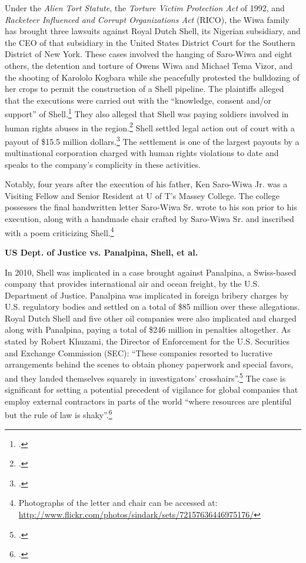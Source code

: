 \documentclass[10pt]{article}
\begin{document}
Under the \emph{Alien Tort Statute}, the \emph{Torture Victim Protection Act} of 1992, and \emph{Racketeer Influenced and Corrupt Organizations Act} (RICO), the Wiwa family has brought three lawsuits against Royal Dutch Shell, its Nigerian subsidiary, and the CEO of that subsidiary in the United States District Court for the Southern District of New York.
These cases involved the hanging of Saro-Wiwa and eight others, the detention and torture of Owens Wiwa and Michael Tema Vizor, and the shooting of Karololo Kogbara while she peacefully protested the bulldozing of her crops to permit the construction of a Shell pipeline.
The plaintiffs alleged that the executions were carried out with the ``knowledge, consent and/or support'' of Shell.\footcite{ShellTrialDelayed}
They also alleged that Shell was paying soldiers involved in human rights abuses in the region.\footcite{Shell15Million}
Shell settled legal action out of court with a payout of \$15.5 million dollars.\footcite{Shell15Million}
The settlement is one of the largest payouts by a multinational corporation charged with human rights violations to date and speaks to the company's complicity in these activities.



Notably, four years after the execution of his father, Ken Saro-Wiwa Jr. was a Visiting Fellow and Senior Resident at U of T's Massey College.
The college possesses the final handwritten letter Saro-Wiwa Sr. wrote to his son prior to his execution, along with a handmade chair crafted by Saro-Wiwa Sr. and inscribed with a poem criticizing Shell.\footnote{Photographs of the letter and chair can be accessed at: \url{http://www.flickr.com/photos/sindark/sets/72157636446975176/}}



\textbf{US Dept. of Justice vs. Panalpina, Shell, et al.}



In 2010, Shell was implicated in a case brought against Panalpina, a Swiss-based company that provides international air and ocean freight, by the U.S. Department of Justice. 
Panalpina was implicated in foreign bribery charges by U.S. regulatory bodies and settled on a total of \$85 million over these allegations. 
Royal Dutch Shell and five other oil companies were also implicated and charged along with Panalpina, paying a total of \$246 million in penalties altogether. 
As stated by Robert Khuzami, the Director of Enforcement for the U.S. Securities and Exchange Commission (SEC): ``These companies resorted to lucrative arrangements behind the scenes to obtain phoney paperwork and special favors, and they landed themselves squarely in investigators’ crosshairs''.\footcite[][p. 119]{KochanGoodYear_2011} 
The case is significant for setting a potential precedent of vigilance for global companies that employ external contractors in parts of the world ``where resources are plentiful but the rule of law is shaky''.\footcite[][]{Bribery_2010}
\end{document}
